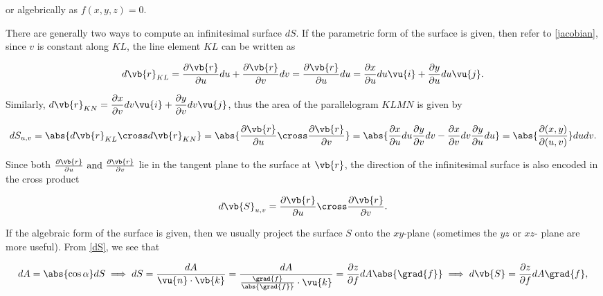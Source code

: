 \documentclass[english,a4paper,12pt]{report}
\begin{document}
or algebrically as \(f(x,y,z) = 0\). 

There are generally two ways to compute an infinitesimal surface \(dS\). If the parametric form of the surface is given, then refer to \cref{jacobian}, since \(v\) is constant along \(KL\), the line element \(KL\) can be written as 

\begin{equation}
	d\vb{r} _{KL} = \frac{\partial \vb{r} }{\partial u}du+ \frac{\partial \vb{r} }{\partial v}dv = \frac{\partial \vb{r} }{\partial u}du = \frac{\partial x}{\partial u} du \vu{i} + \frac{\partial y}{\partial u} du \vu{j}.
\end{equation}

Similarly, \(\displaystyle d\vb{r} _{KN}  = \frac{\partial x}{\partial v} dv \vu{i} + \frac{\partial y}{\partial v} dv \vu{j}\), thus the area of the parallelogram \(KLMN\) is given by

\begin{equation}
	dS_{u,v} = \abs{d\vb{r} _{KL} \cross  d\vb{r} _{KN}} = \abs{\frac{\partial \vb{r} }{\partial u} \cross \frac{\partial \vb{r} }{\partial v} } = \abs{\frac{\partial x}{\partial u} du \frac{\partial y}{\partial v} dv - \frac{\partial x}{\partial v} dv \frac{\partial y}{\partial u} du} = \abs{\frac{\partial (x,y)}{\partial (u,v)} } dudv.
\end{equation}

Since both \(\frac{\partial \vb{r} }{\partial u} \text { and } \frac{\partial \vb{r} }{\partial v}  \) lie in the tangent plane to the surface at \(\vb{r} \), the direction of the infinitesimal surface is also encoded in the cross product

\begin{equation}
	d\vb{S} _{u,v} = \frac{\partial \vb{r} }{\partial u} \cross \frac{\partial \vb{r} }{\partial v}.   
\end{equation}



If the algebraic form of the surface is given, then we usually project the surface \(S\) onto the \(xy\)-plane (sometimes the \(yz \text { or } xz\)- plane are more useful). From \cref{dS}, we see that 

\begin{equation} \label{dseq} 
	dA = \abs{\cos \alpha }dS \implies dS = \frac{dA}{\vu{n} \cdot \vb{k} } = \frac{dA}{\frac{\grad{f} }{\abs{\grad{f} } } \cdot \vu{k}  } =  \frac{\partial z}{\partial f}dA\abs{\grad{f} } \implies d\vb{S} = \frac{\partial z}{\partial f} dA\grad{f} , 
\end{equation}
\end{document}

